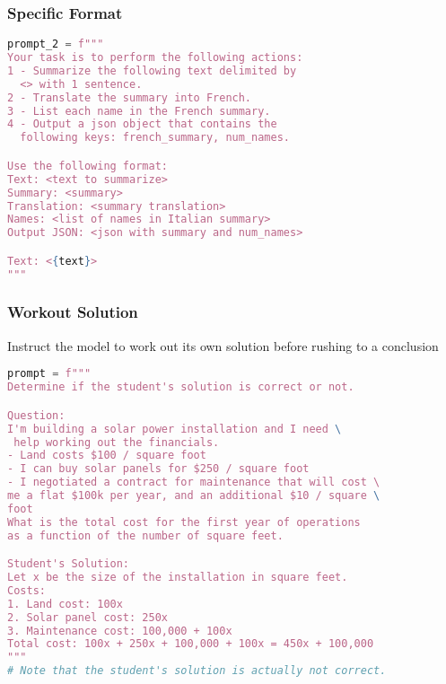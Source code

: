 \begin{frame}[fragile]\frametitle{Specific Format}

\begin{lstlisting}[language=Python]
prompt_2 = f"""
Your task is to perform the following actions: 
1 - Summarize the following text delimited by 
  <> with 1 sentence.
2 - Translate the summary into French.
3 - List each name in the French summary.
4 - Output a json object that contains the 
  following keys: french_summary, num_names.

Use the following format:
Text: <text to summarize>
Summary: <summary>
Translation: <summary translation>
Names: <list of names in Italian summary>
Output JSON: <json with summary and num_names>

Text: <{text}>
"""
\end{lstlisting}
\end{frame}


\begin{frame}[fragile]\frametitle{Workout Solution}

Instruct the model to work out its own solution before rushing to a conclusion

{\tiny
\begin{lstlisting}[language=Python]
prompt = f"""
Determine if the student's solution is correct or not.

Question:
I'm building a solar power installation and I need \
 help working out the financials. 
- Land costs $100 / square foot
- I can buy solar panels for $250 / square foot
- I negotiated a contract for maintenance that will cost \ 
me a flat $100k per year, and an additional $10 / square \
foot
What is the total cost for the first year of operations 
as a function of the number of square feet.

Student's Solution:
Let x be the size of the installation in square feet.
Costs:
1. Land cost: 100x
2. Solar panel cost: 250x
3. Maintenance cost: 100,000 + 100x
Total cost: 100x + 250x + 100,000 + 100x = 450x + 100,000
"""
# Note that the student's solution is actually not correct.
\end{lstlisting}
}

\end{frame}

